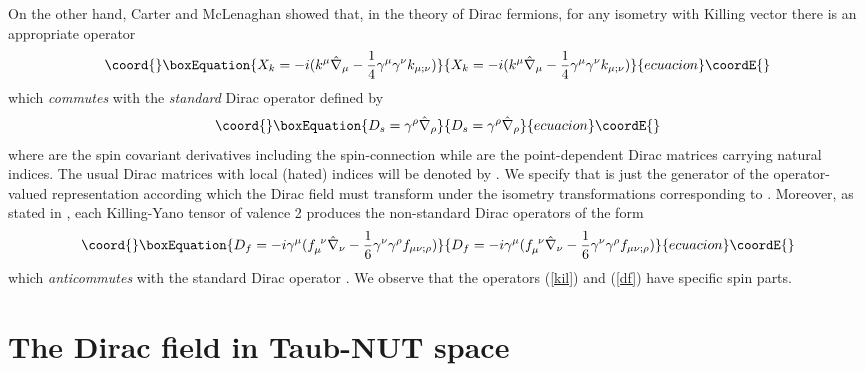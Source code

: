 \documentclass[a4paper,12pt]{article}
\begin{document}
On the other hand, Carter and McLenaghan \cite{CML} showed that, in the theory 
of Dirac fermions, for any isometry with Killing vector \coordHE{} there is an 
appropriate operator 
\begin{equation}\coord{}\boxEquation{\label{kil}
X_k = -i ( k^\mu \hat\nabla_\mu - {1\over 4} \gamma^\mu \gamma^\nu 
k_{\mu;\nu})
}{X_k = -i ( k^\mu \hat\nabla_\mu - {1\over 4} \gamma^\mu \gamma^\nu 
k_{\mu;\nu})
}{ecuacion}\coordE{}\end{equation}
which {\em commutes}  with the  {\em standard} Dirac operator 
defined by
\begin{equation}\coord{}\boxEquation{\label{ds}
D_s = \gamma^\rho \hat\nabla_\rho
}{D_s = \gamma^\rho \hat\nabla_\rho
}{ecuacion}\coordE{}\end{equation}
where \myHighlight{$\hat\nabla_\rho$}\coordHE{} are the spin covariant derivatives including the  
spin-con\-nec\-ti\-on while \myHighlight{$\gamma^\mu$}\coordHE{} are the point-dependent  Dirac 
matrices carrying natural indices. The usual Dirac matrices with local 
(hated) indices will be denoted by \myHighlight{$\hat\gamma^{\hat\mu}$}\coordHE{}. We specify that
\coordHE{} is just the generator of the 
operator-valued representation according which the Dirac field must transform 
under the isometry transformations corresponding to \coordHE{} \cite{ES}. 
Moreover, as stated in \cite{CML}, each Killing-Yano tensor \coordHE{} 
of valence 2 produces the non-standard Dirac operators of the form 
\begin{equation}\coord{}\boxEquation{\label{df}
D_f = -i\gamma^\mu (f_\mu ^{~\nu}\hat\nabla_\nu  - 
{1\over 6}\gamma^\nu 
\gamma^\rho f_{\mu\nu;\rho})
}{D_f = -i\gamma^\mu (f_\mu ^{~\nu}\hat\nabla_\nu  - 
{1\over 6}\gamma^\nu 
\gamma^\rho f_{\mu\nu;\rho})
}{ecuacion}\coordE{}\end{equation}
which {\em anticommutes} with the standard Dirac operator \coordHE{}. We observe 
that the operators (\ref{kil}) and (\ref{df}) have specific spin parts. 

\section{The Dirac field in Taub-NUT space}
\end{document}

